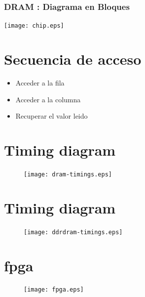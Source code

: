 \documentclass{beamer}
\begin{document}
\begin{frame}
\frametitle{DRAM : Diagrama en Bloques}
	\begin{center}
		\texttt{[image: chip.eps]}
	\end{center}
\end{frame}

\section{Secuencia de acceso}
\begin{frame}
	\begin{itemize}
		\item Acceder a la fila
		\item Acceder a la columna
		\item Recuperar el valor leido
	\end{itemize}
\end{frame}

\section{Timing diagram}
\begin{frame}
\begin{figure}[!htb]
\centering
\texttt{[image: dram-timings.eps]}
\end{figure}
\end{frame}

\section{Timing diagram}
\begin{frame}
\begin{figure}[!htb]
\centering
\texttt{[image: ddrdram-timings.eps]}
\end{figure}
\end{frame}

\section{fpga}
\begin{frame}
\begin{figure}[!htb]
\centering
\texttt{[image: fpga.eps]}
\end{figure}
\end{frame}
\end{document}
